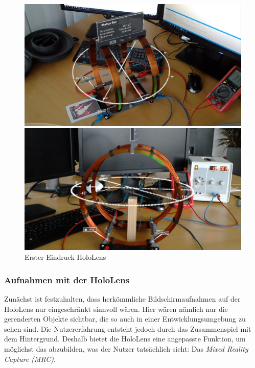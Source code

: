 \begin{figure}[h!]
	\centering
	\includegraphics[width=\textwidth]{images/HL_SS1.jpg}

	\vspace{0.25cm}

	\includegraphics[width=\textwidth]{images/HL_SS2.jpg}
	\caption{Erster Eindruck HoloLens}
	\label{img:HL_SS_Intro}
\end{figure}

\subsubsection{Aufnahmen mit der HoloLens}
\label{sec-5-2-1}
Zunächst ist festzuhalten, dass herkömmliche Bildschirmaufnahmen auf der HoloLens nur eingeschränkt sinnvoll wären. Hier wären nämlich nur die gerenderten Objekte sichtbar, die so auch in einer Entwicklungsumgebung zu sehen sind. Die Nutzererfahrung entsteht jedoch durch das Zusammenspiel mit dem Hintergrund. Deshalb bietet die HoloLens eine angepasste Funktion, um möglichst das abzubilden, was der Nutzer tatsächlich sieht: Das \textit{Mixed Reality Capture (MRC)}.\\

